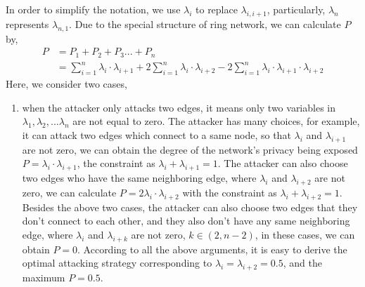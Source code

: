 \documentclass[10pt,journal,compsoc]{IEEEtran}
\begin{document}
In order to simplify the notation, we use $\lambda_{i}$ to replace $\lambda_{i, i+1}$, particularly, $\lambda_{n}$ represents $\lambda_{n, 1}$. Due to the special structure of ring network, we can calculate $P$ by,
\begin{equation} \label{calculate P in ring network}
\begin{split}
P &= P_{1}+P_{2}+P_{3}...+P_{n}\\
&=\sum_{i=1}^{n}\lambda_{i}\cdot\lambda_{i+1}+2\sum_{i=1}^{n}\lambda_{i}\cdot\lambda_{i+2}-2\sum_{i=1}^{n}\lambda_{i}\cdot\lambda_{i+1}\cdot\lambda_{i+2}
\end{split}
\end{equation}
Here, we consider two cases,
\begin{enumerate}
\item when the attacker only attacks two edges, it means only two variables in $\lambda_{1},\lambda_{2},...\lambda_{n}$ are not equal to zero. The attacker has many choices, for example, it can attack two edges which connect to a same node, so that $\lambda_{i}$ and $\lambda_{i+1}$ are not zero, we can obtain the degree of the network's privacy being exposed $P = \lambda_{i}\cdot\lambda_{i+1}$, the constraint as $\lambda_{i}+\lambda_{i+1} = 1$. The attacker can also choose two edges who have the same neighboring edge, where $\lambda_{i}$ and $\lambda_{i+2}$ are not zero, we can calculate $P = 2\lambda_{i}\cdot\lambda_{i+2}$ with the constraint as $\lambda_{i}+\lambda_{i+2}=1$. Besides the above two cases, the attacker can also choose two edges that they don't connect to each other, and they also don't have any same neighboring edge, where $\lambda_{i}$ and $\lambda_{i+k}$ are not zero, $k \in {(2,n-2)}$, in these cases, we can obtain $P = 0$. According to all the above arguments, it is easy to derive the optimal attacking strategy corresponding to $\lambda_{i} = \lambda_{i+2}=0.5$, and the maximum $P = 0.5$.


\end{enumerate}
\end{document}
